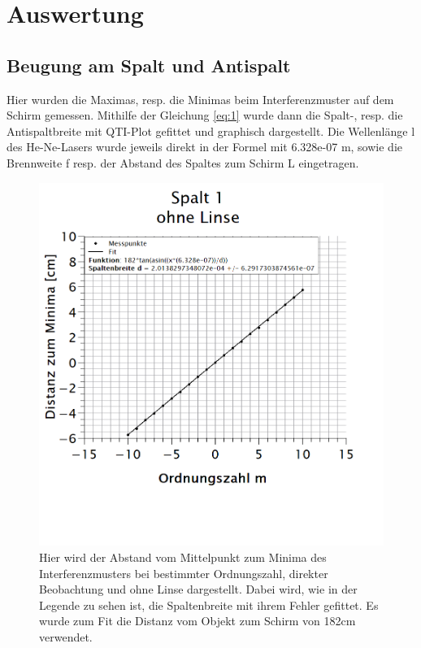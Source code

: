 \chapter{Auswertung}
\label{chap:auswertung}
\thispagestyle{fancy}
\section{Beugung am Spalt und Antispalt}
Hier wurden die Maximas, resp. die Minimas beim Interferenzmuster auf dem Schirm gemessen. Mithilfe der Gleichung \ref{eq:1} wurde dann die Spalt-, resp. die Antispaltbreite mit QTI-Plot gefittet und graphisch dargestellt. Die Wellenlänge l des He-Ne-Lasers wurde jeweils direkt in der Formel mit 6.328e-07 m, sowie die Brennweite f resp. der Abstand des Spaltes zum Schirm L eingetragen.\\
\vspace{-0.5cm}
\begin{figure}[h]
\centering
\includegraphics[width=\textwidth]{Bilder/spalt1_ohneLinse.png}
\vspace*{-3.5cm}
\caption[Spalt 1: ohne Linse]{Hier wird der Abstand vom Mittelpunkt zum Minima des Interferenzmusters bei bestimmter Ordnungszahl, direkter Beobachtung und ohne Linse dargestellt. Dabei wird, wie in der Legende zu sehen ist, die Spaltenbreite mit ihrem Fehler gefittet. Es wurde zum Fit die Distanz vom Objekt zum Schirm von 182cm verwendet.}
\label{fig:spalt1_ohneLinse}
\end{figure}
